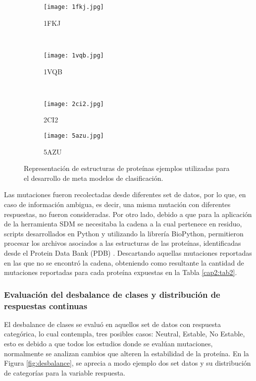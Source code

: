 \begin{figure}
	\centering
	\begin{subfigure}{0.4\textwidth}
		\texttt{[image: 1fkj.jpg]}
		\caption{1FKJ}
		\label{fig:1FKJ}
	\end{subfigure}
	~ %
	\begin{subfigure}{0.4\textwidth}
		\texttt{[image: 1vqb.jpg]}
		\caption{1VQB}
		\label{fig:1VQB}
	\end{subfigure}
	~ %
	\begin{subfigure}{0.4\textwidth}
		\texttt{[image: 2ci2.jpg]}
		\caption{2CI2}
		\label{fig:2CI2}
	\end{subfigure}
	
	\begin{subfigure}{0.4\textwidth}
		\texttt{[image: 5azu.jpg]}
		\caption{5AZU}
		\label{fig:5AZU}
	\end{subfigure}
	\caption{Representación de estructuras de proteínas ejemplos utilizadas para el desarrollo de meta modelos de clasificación.}
	\label{fig:proteins}
\end{figure}

Las mutaciones fueron recolectadas desde diferentes set de datos, por lo que, en caso de información ambigua, es decir, una misma mutación con diferentes respuestas, no fueron consideradas. Por otro lado, debido a que para la aplicación de la herramienta SDM se necesitaba la cadena a la cual pertenece en residuo, scripts desarrollados en Python y utilizando la librería BioPython, permitieron procesar los archivos asociados a las estructuras de las proteínas, identificadas desde el Protein Data Bank (PDB) \cite{abola1984protein}. Descartando aquellas mutaciones reportadas en las que no se encontró la cadena, obteniendo como resultante la cantidad de mutaciones reportadas para cada proteína expuestas en la Tabla \ref{cap2:tab2}.

\subsubsection{Evaluación del desbalance de clases y distribución de respuestas continuas}

El desbalance de clases se evaluó en aquellos set de datos con respuesta categórica, lo cual contempla, tres posibles casos: Neutral, Estable, No Estable, esto es debido a que todos los estudios donde se evalúan mutaciones, normalmente se analizan cambios que alteren la estabilidad de la proteína. En la Figura \ref{fig:desbalance}, se aprecia a modo ejemplo dos set datos y su distribución de categorías para la variable respuesta.

